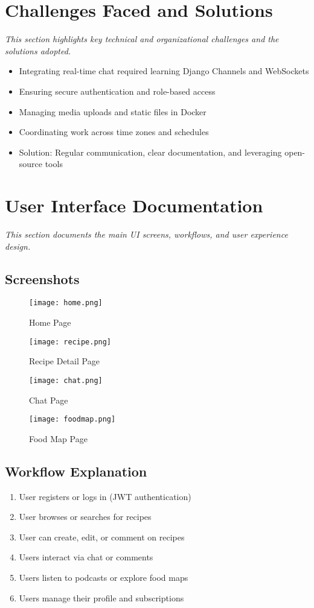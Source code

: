 \documentclass[conference]{IEEEtran}
\begin{document}
\section{Challenges Faced and Solutions}
\textit{This section highlights key technical and organizational challenges and the solutions adopted.}
\begin{itemize}
    \item Integrating real-time chat required learning Django Channels and WebSockets
    \item Ensuring secure authentication and role-based access
    \item Managing media uploads and static files in Docker
    \item Coordinating work across time zones and schedules
    \item Solution: Regular communication, clear documentation, and leveraging open-source tools
\end{itemize}

\section{User Interface Documentation}
\textit{This section documents the main UI screens, workflows, and user experience design.}
\subsection{Screenshots}
\begin{figure}[t]
    \centering
    \texttt{[image: home.png]}
    \caption{Home Page}
\end{figure}
\begin{figure}[t]
    \centering
    \texttt{[image: recipe.png]}
    \caption{Recipe Detail Page}
\end{figure}
\begin{figure}[t]
    \centering
    \texttt{[image: chat.png]}
    \caption{Chat Page}
\end{figure}
\begin{figure}[t]
    \centering
    \texttt{[image: foodmap.png]}
    \caption{Food Map Page}
\end{figure}

\subsection{Workflow Explanation}
\begin{enumerate}
    \item User registers or logs in (JWT authentication)
    \item User browses or searches for recipes
    \item User can create, edit, or comment on recipes
    \item Users interact via chat or comments
    \item Users listen to podcasts or explore food maps
    \item Users manage their profile and subscriptions
\end{enumerate}
\end{document}
